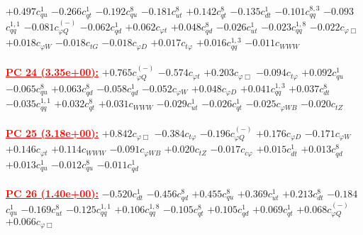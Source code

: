 \documentclass{article}
\begin{document}
{$+0.497$}{\rm $c_{qu}^{1}$}
{$-0.266$}{\rm $c_{qt}^{1}$}
{$-0.192$}{\rm $c_{qu}^{8}$}
{$-0.181$}{\rm $c_{ut}^{8}$}
{$+0.142$}{\rm $c_{qt}^{8}$}
{$-0.135$}{\rm $c_{dt}^{1}$}
{$-0.101$}{\rm $c_{qq}^{8,3}$}
{$-0.093$}{\rm $c_{qq}^{1,1}$}
{$-0.081$}{\rm $c_{\varphi Q}^{(-)}$}
{$-0.062$}{\rm $c_{qd}^{1}$}
{$+0.062$}{\rm $c_{\varphi t}$}
{$+0.048$}{\rm $c_{qd}^{8}$}
{$-0.026$}{\rm $c_{ut}^{1}$}
{$-0.023$}{\rm $c_{qq}^{1,8}$}
{$-0.022$}{\rm $c_{\varphi \Box}$}
{$+0.018$}{\rm $c_{\varphi W}$}
{$-0.018$}{\rm $c_{tG}$}
{$-0.018$}{\rm $c_{\varphi D}$}
{$+0.017$}{\rm $c_{t \varphi}$}
{$+0.016$}{\rm $c_{qq}^{1,3}$}
{$-0.011$}{\rm $c_{WWW}$}
 \nonumber \\ \nonumber \\
\noindent \textcolor{red}{\underline{\bf{PC 24} (3.35e+00):}}
{$+0.765$}{\rm $c_{\varphi Q}^{(-)}$}
{$-0.574$}{\rm $c_{\varphi t}$}
{$+0.203$}{\rm $c_{\varphi \Box}$}
{$-0.094$}{\rm $c_{t \varphi}$}
{$+0.092$}{\rm $c_{qu}^{1}$}
{$-0.065$}{\rm $c_{qu}^{8}$}
{$+0.063$}{\rm $c_{qd}^{8}$}
{$-0.058$}{\rm $c_{qd}^{1}$}
{$-0.052$}{\rm $c_{\varphi W}$}
{$+0.048$}{\rm $c_{\varphi D}$}
{$+0.041$}{\rm $c_{qq}^{1,3}$}
{$+0.037$}{\rm $c_{dt}^{8}$}
{$-0.035$}{\rm $c_{qq}^{1,1}$}
{$+0.032$}{\rm $c_{qt}^{8}$}
{$+0.031$}{\rm $c_{WWW}$}
{$-0.029$}{\rm $c_{ut}^{1}$}
{$-0.026$}{\rm $c_{qt}^{1}$}
{$-0.025$}{\rm $c_{\varphi WB}$}
{$-0.020$}{\rm $c_{tZ}$}
 \nonumber \\ \nonumber \\
\noindent \textcolor{red}{\underline{\bf{PC 25} (3.18e+00):}}
{$+0.842$}{\rm $c_{\varphi \Box}$}
{$-0.384$}{\rm $c_{t \varphi}$}
{$-0.196$}{\rm $c_{\varphi Q}^{(-)}$}
{$+0.176$}{\rm $c_{\varphi D}$}
{$-0.171$}{\rm $c_{\varphi W}$}
{$+0.146$}{\rm $c_{\varphi t}$}
{$+0.114$}{\rm $c_{WWW}$}
{$-0.091$}{\rm $c_{\varphi WB}$}
{$+0.020$}{\rm $c_{tZ}$}
{$-0.017$}{\rm $c_{c \varphi}$}
{$+0.015$}{\rm $c_{dt}^{1}$}
{$+0.013$}{\rm $c_{qd}^{8}$}
{$+0.013$}{\rm $c_{qu}^{1}$}
{$-0.012$}{\rm $c_{qu}^{8}$}
{$-0.011$}{\rm $c_{qd}^{1}$}
 \nonumber \\ \nonumber \\
\noindent \textcolor{red}{\underline{\bf{PC 26} (1.40e+00):}}
{$-0.520$}{\rm $c_{dt}^{1}$}
{$-0.456$}{\rm $c_{qd}^{8}$}
{$+0.455$}{\rm $c_{qu}^{8}$}
{$+0.369$}{\rm $c_{ut}^{1}$}
{$+0.213$}{\rm $c_{dt}^{8}$}
{$-0.184$}{\rm $c_{qu}^{1}$}
{$-0.169$}{\rm $c_{ut}^{8}$}
{$-0.125$}{\rm $c_{qq}^{1,1}$}
{$+0.106$}{\rm $c_{qq}^{1,8}$}
{$-0.105$}{\rm $c_{qt}^{8}$}
{$+0.105$}{\rm $c_{qd}^{1}$}
{$+0.069$}{\rm $c_{qt}^{1}$}
{$+0.068$}{\rm $c_{\varphi Q}^{(-)}$}
{$+0.066$}{\rm $c_{\varphi \Box}$}
\end{document}
